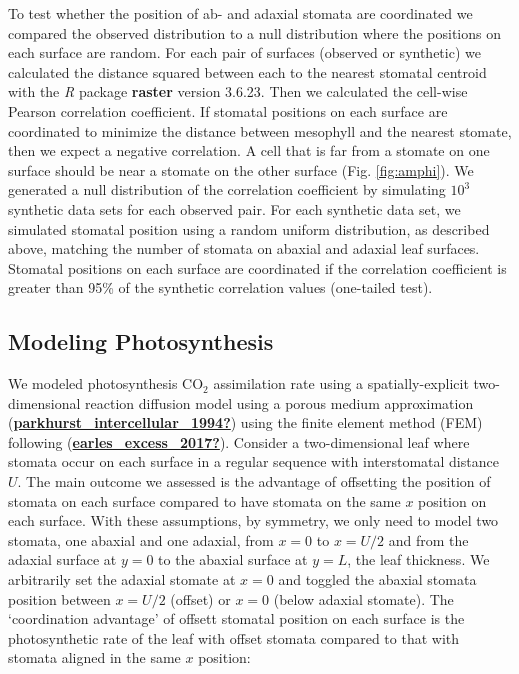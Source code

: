 \documentclass[12pt,halfline,a4paper,]{ouparticle}
\begin{document}
To test whether the position of ab- and adaxial stomata are coordinated
we compared the observed distribution to a null distribution where the
positions on each surface are random. For each pair of surfaces
(observed or synthetic) we calculated the distance squared between each
to the nearest stomatal centroid with the \emph{R} package
\textbf{raster} version 3.6.23. Then we calculated the cell-wise Pearson
correlation coefficient. If stomatal positions on each surface are
coordinated to minimize the distance between mesophyll and the nearest
stomate, then we expect a negative correlation. A cell that is far from
a stomate on one surface should be near a stomate on the other surface
(Fig. \ref{fig:amphi}). We generated a null distribution of the
correlation coefficient by simulating \(10^3\) synthetic data sets for
each observed pair. For each synthetic data set, we simulated stomatal
position using a random uniform distribution, as described above,
matching the number of stomata on abaxial and adaxial leaf surfaces.
Stomatal positions on each surface are coordinated if the correlation
coefficient is greater than 95\% of the synthetic correlation values
(one-tailed test).

\hypertarget{modeling-photosynthesis}{%
\subsection{Modeling Photosynthesis}\label{modeling-photosynthesis}}

We modeled photosynthesis CO\(_2\) assimilation rate using a
spatially-explicit two-dimensional reaction diffusion model using a
porous medium approximation
(\protect\hyperlink{ref-parkhurst_intercellular_1994}{\textbf{parkhurst\_intercellular\_1994?}})
using the finite element method (FEM) following
(\protect\hyperlink{ref-earles_excess_2017}{\textbf{earles\_excess\_2017?}}).
Consider a two-dimensional leaf where stomata occur on each surface in a
regular sequence with interstomatal distance \(U\). The main outcome we
assessed is the advantage of offsetting the position of stomata on each
surface compared to have stomata on the same \(x\) position on each
surface. With these assumptions, by symmetry, we only need to model two
stomata, one abaxial and one adaxial, from \(x = 0\) to \(x = U/2\) and
from the adaxial surface at \(y = 0\) to the abaxial surface at
\(y = L\), the leaf thickness. We arbitrarily set the adaxial stomate at
\(x = 0\) and toggled the abaxial stomata position between \(x = U/2\)
(offset) or \(x = 0\) (below adaxial stomate). The `coordination
advantage' of offsett stomatal position on each surface is the
photosynthetic rate of the leaf with offset stomata compared to that
with stomata aligned in the same \(x\) position:
\end{document}
